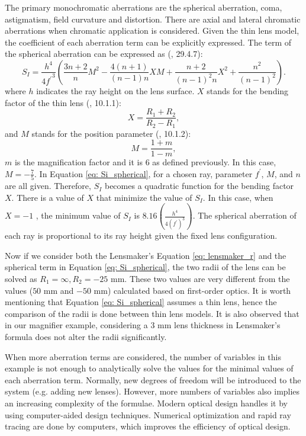 The primary monochromatic aberrations are the spherical aberration, coma, astigmatism, field curvature and distortion. There are axial and lateral chromatic aberrations when chromatic application is considered. Given the thin lens model, the coefficient of each aberration term can be explicitly expressed. The term of the spherical aberration can be expressed as (\cite{GrossHBOvol1}, 29.4.7):
\begin{equation} \label{eq: Si_spherical}
    S_I = \frac{h^4}{4{f^\prime}^3}\left(\frac{3n+2}{n}M^2 - \frac{4(n+1)}{(n-1)n}XM + \frac{n+2}{(n-1)^2n}X^2 + \frac{n^2}{(n-1)^2}\right).
\end{equation}                            %
where $h$ indicates the ray height on the lens surface. $X$ stands for the bending factor of the thin lens (\cite{GrossHBOvol1}, 10.1.1):
\begin{equation} \label{eqn: bending factor}
X = \frac{R_1+R_2}{R_2-R_1},
\end{equation}and $M$ stands for the position parameter (\cite{GrossHBOvol1}, 10.1.2):
\begin{equation} \label{eqn: position parameter}
M = \frac{1+m}{1-m},
\end{equation}$m$ is the magnification factor and it is $6$ as defined previously. In this case, $M=-\frac{7}{5}$. In Equation \ref{eq: Si_spherical}, for a chosen ray, parameter $f^\prime$, $M$, and $n$ are all given. Therefore, $S_I$ becomes a quadratic function for the bending factor $X$. There is a value of $X$ that minimize the value of $S_I$. In this case, when $X = -1$ , the minimum value of $S_I $ is $ 8.16(\frac{h^4}{4(f^\prime)^3})$. The spherical aberration of each ray is proportional to its ray height given the fixed lens configuration. 

Now if we consider both the Lensmaker's Equation \ref{eq: lensmaker_r} and the spherical term in Equation \ref{eq: Si_spherical}, the two radii of the lens can be solved as $R_1 = \infty, R_2 = -25$ mm. These two values are very different from the values ($50$ mm and $-50$ mm) calculated based on first-order optics. It is worth mentioning that Equation \ref{eq: Si_spherical} assumes a thin lens, hence the comparison of the radii is done between thin lens models. It is also observed that in our magnifier example, considering a $3$ mm lens thickness in Lensmaker's formula does not alter the radii significantly.  

When more aberration terms are considered, the number of variables in this example is not enough to analytically solve the values for the minimal values of each aberration term. Normally, new degrees of freedom will be introduced to the system (e.g. adding new lenses). However, more numbers of variables also implies an increasing complexity of the formulae. Modern optical design handles it by using computer-aided design techniques. Numerical optimization and rapid ray tracing are done by computers, which improves the efficiency of optical design.  


